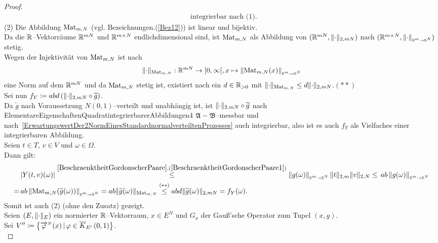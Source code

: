 \begin{proof}
\begin{align*}
\ \text{ integrierbar nach (1).}
\end{align*}
(2) Die Abbildung $\mathop{\textrm{Mat}}\nolimits_{m, N}$ (vgl. Bezeichnungen.(\ref{Bez12})) ist linear
und bijektiv.\\
Da die $\mathbb{R}$--Vektorräume $\mathbb{R}^{mN}$ und $\mathbb{R}^{m\times N}$ endlichdimensional
sind, ist $\mathop{\textrm{Mat}}\nolimits_{m,N}$ als Abbildung von $(\mathbb{R}^{mN}, \lVert\cdot\rVert_{2, mN})$ nach
$(\mathbb{R}^{m \times N}, \left\|\cdot\right\|_{\scriptscriptstyle{\ensuremath{\mathbb{R}}^m \rightarrow \ensuremath{\mathbb{R}}^N}})$ stetig.\\
Wegen der Injektivität von $\mathop{\textrm{Mat}}\nolimits_{m,N}$ ist nach
\[\lVert\cdot\rVert_{\mathop{\textrm{Mat}}\nolimits_{m, N}}: \mathbb{R}^{mN} \rightarrow [0, \infty[,
x \mapsto \left\|\mathop{\textrm{Mat}}\nolimits_{m, N}(x)\right\|_{\scriptscriptstyle{\ensuremath{\mathbb{R}}^m \rightarrow \ensuremath{\mathbb{R}}^N}}\]
eine Norm auf dem $\mathbb{R}^{mN}$ und da $\mathop{\textrm{Mat}}\nolimits_{m, N}$ stetig ist, existiert nach
ein $d \in \mathbb{R}_{>0}$ mit
$\lVert\cdot\rVert_{\mathop{\textrm{Mat}}\nolimits_{m, N}} \le d \lVert\cdot\rVert_{2, mN}$.\hfill $(\ast\ast)$\\
Sei nun $f_Y \coloneqq  abd \left(\lVert\cdot\rVert_{2, mN} \circ \widetilde g \right)$.\\
Da $\widetilde g$ nach Voraussetzung $N(0, 1)$--verteilt und unabhängig ist,
ist $\lVert\cdot\rVert_{2, mN} \circ \widetilde g$ nach
{ElementareEigenschaftenQuadratintegrierbarerAbbildungen4}
$\mathfrak{A}-\mathfrak{B}$--messbar und nach~\ref{ErwartungswertDer2NormEinesStandardnormalverteiltenProzesses}
auch integrierbar, also ist es auch $f_Y$ als Vielfaches einer integrierbaren
Abbildung.\\
Seien $t \in T$, $v \in V$ und $\omega \in \Omega$.\\
Dann gilt:
\begin{align*}
&\abs{Y(t, v)(\omega)} \overset{\refclaim{BeschraenktheitGordonscherPaare}
{BeschraenktheitGordonscherPaare1}}\le 
 \opnorm{g(\omega)}{\R^m}{\R^N}\norm t _{2, m}\norm v_{2, N}
 \le\, ab\opnorm{g(\omega)}{\R^m}{\R^N}\\
  =&\, ab \opnorm{\Mat_{m, N}(\widetilde g (\omega))}{\R^m}{\R^N}
 = ab \norm{\widetilde g (\omega)}_{\Mat_{m, N}} \overset{(\ast\ast)}\le
 abd \norm{\widetilde g (\omega)}_{2, mN} = f_Y(\omega) \text.
\end{align*}
Somit ist auch (2) (ohne den Zusatz) gezeigt.\\
Seien $(E, \lVert\cdot\rVert_E)$ ein normierter $\mathbb{R}$--Vektorraum, $x \in E^N$ und
$G_x$ der Gauß'sche Operator zum Tupel $(x,g)$.\\
Sei $V''\coloneqq  \left\{{\overrightarrow{\varphi}}^{{}_N}(x)\,|\,\varphi \in \overline K_{E'}\left(0, 1\right)\right\}$.\\

\end{proof}
